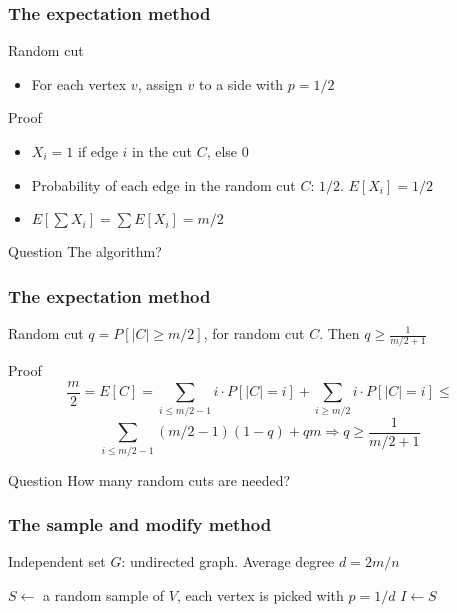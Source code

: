 \documentclass[12pt,aspectratio=169]{beamer}
\begin{document}
\begin{frame}[fragile]
\frametitle{The expectation method}
\begin{block}{Random cut}
  \begin{itemize}
    \item
      For each vertex $v$, assign $v$ to a side with $p=1/2$
    \end{itemize}
  \end{block}

  \begin{block}{Proof}
    \begin{itemize}
    \item
      $X_{i} = 1$ if edge $i$ in the cut $C$, else $0$
    \item
      Probability of each edge in the random cut $C$: $1/2$.
%
      $E[X_{i}] = 1/2$
    \item
      $E[\sum X_{i}] = \sum E[X_{i}] = m/2$
    \end{itemize}
  \end{block}

  \begin{block}{Question}
    The algorithm?
  \end{block}
\end{frame}

\begin{frame}[fragile]
\frametitle{The expectation method}
\begin{block}{Random cut}
      $q=P[|C| \ge m/2]$, for random cut $C$.
%
      Then $q\ge \frac{1}{m/2 + 1}$
  \end{block}

  \begin{block}{Proof}
    \[
      \frac{m}{2} = E[C] = \sum_{i\le m/2 - 1} i \cdot P[|C| = i] +
      \sum_{i\ge m/2} i \cdot P[|C| = i] \le 
    \]
    \[
      \sum_{i\le m/2 - 1} (m/2 - 1)(1-q) + qm \Rightarrow q \ge \frac{1}{m/2 + 1}
      \]
  \end{block}

  \begin{block}{Question}
    How many random cuts are needed?
  \end{block}
\end{frame}

\begin{frame}[fragile]
\frametitle{The sample and modify method}
  \begin{block}{Independent set}
    $G$: undirected graph.
%
    Average degree $d=2m/n$
  \end{block}


\begin{algorithm}[H]
$S\gets$ a random sample of $V$, each vertex is picked with $p=1/d$\;
$I\gets S$\;
\caption{Random Independent Set}
\end{algorithm}
\end{frame}
\end{document}
